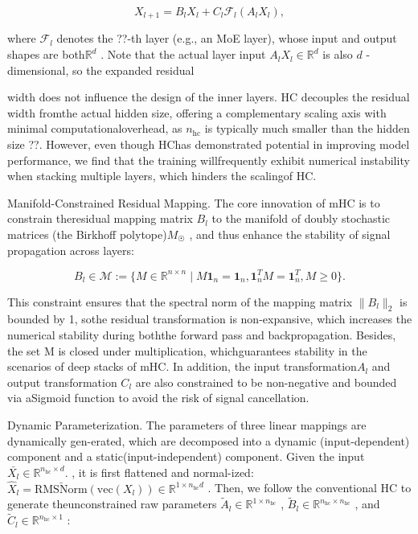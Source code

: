 \documentclass[
  10
]{article}
\begin{document}
\[
X _ {l + 1} = B _ {l} X _ {l} + C _ {l} \mathcal {F} _ {l} \left(A _ {l} X _ {l}\right), \tag {1}
\]

where \(\mathcal { F } _ { l }\) denotes the ??-th layer (e.g., an MoE
layer), whose input and output shapes are both\(\mathbb { R } ^ { d }\)
. Note that the actual layer input
\(A _ { l } X _ { l } \in \mathbb { R } ^ { d }\) is also \(d\)
-dimensional, so the expanded residual

width does not influence the design of the inner layers. HC decouples
the residual width fromthe actual hidden size, offering a complementary
scaling axis with minimal computationaloverhead, as
\(n _ { \mathrm { h c } }\) is typically much smaller than the hidden
size ??. However, even though HChas demonstrated potential in improving
model performance, we find that the training willfrequently exhibit
numerical instability when stacking multiple layers, which hinders the
scalingof HC.

Manifold-Constrained Residual Mapping. The core innovation of mHC is to
constrain theresidual mapping matrix \(B _ { l }\) to the manifold of
doubly stochastic matrices (the Birkhoff polytope)\(M _ { ☉ }\) , and
thus enhance the stability of signal propagation across layers:

\[
B _ {l} \in \mathcal {M} := \{M \in \mathbb {R} ^ {n \times n} \mid M \mathbf {1} _ {n} = \mathbf {1} _ {n}, \mathbf {1} _ {n} ^ {T} M = \mathbf {1} _ {n} ^ {T}, M \geqslant 0 \}. \tag {2}
\]

This constraint ensures that the spectral norm of the mapping matrix
\(\| B _ { l } \| _ { 2 }\) is bounded by 1, sothe residual
transformation is non-expansive, which increases the numerical stability
during boththe forward pass and backpropagation. Besides, the set M is
closed under multiplication, whichguarantees stability in the scenarios
of deep stacks of mHC. In addition, the input
transformation\(A _ { l }\) and output transformation \(C _ { l }\) are
also constrained to be non-negative and bounded via aSigmoid function to
avoid the risk of signal cancellation.

Dynamic Parameterization. The parameters of three linear mappings are
dynamically gen-erated, which are decomposed into a dynamic
(input-dependent) component and a static(input-independent) component.
Given the input
\(\bar { X _ { l } } \in \mathbb { R } ^ { n _ { \mathrm { h c } } \times d } .\)
, it is first flattened and normal-ized:
\(\hat { X } _ { l } = \bar { \mathrm { R M S N o r m } } ( \mathrm { v e c } ( X _ { l } ) ) \in \mathbb { R } ^ { 1 \times n _ { \mathrm { h c } } d }\)
. Then, we follow the conventional HC to generate theunconstrained raw
parameters
\(\tilde { A } _ { l } \in \mathbb { R } ^ { 1 \times n _ { \mathrm { h c } } }\)
,
\(\tilde { B } _ { l } \in \mathbb { R } ^ { n _ { \mathrm { h c } } \times n _ { \mathrm { h c } } }\)
, and
\(\tilde { C } _ { l } \in \mathbb { R } ^ { n _ { \mathrm { h c } } \times 1 }\)
:
\end{document}
